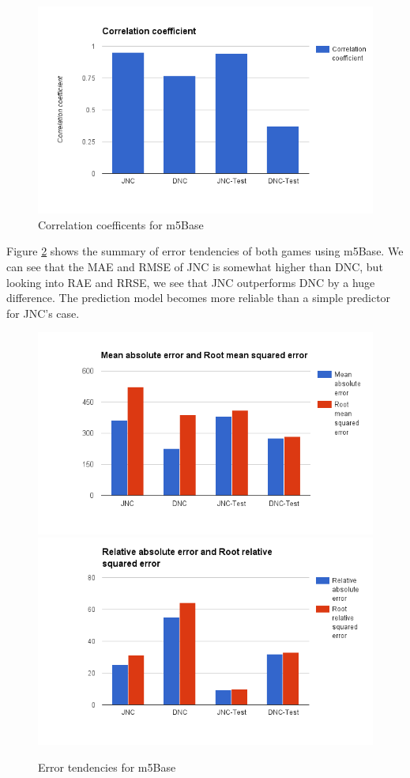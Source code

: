 \begin{figure}[h!]
\centering
\includegraphics[scale=0.3]{figures/m5Base_1.png} 
\caption{Correlation coefficents for m5Base}
\label{fig:correl_m5base}
\end{figure}

Figure \ref{fig:error_m5base} shows the summary of error tendencies of both games using m5Base. We can see that the MAE and RMSE of JNC is somewhat higher than DNC, but looking into RAE and RRSE, we see that JNC outperforms DNC by a huge difference. The prediction model becomes more reliable than a simple predictor for JNC's case.

\begin{figure}[h!]
\centering
\includegraphics[scale=0.3]{figures/m5Base_2.png} 
\includegraphics[scale=0.3]{figures/m5Base_3.png} 
\caption{Error tendencies for m5Base}
\label{fig:error_m5base}
\end{figure}

